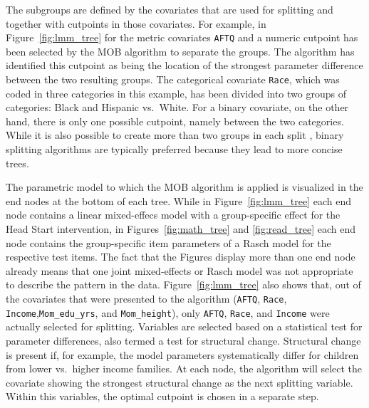 \documentclass[doc,floatsintext,natbib]{apa7}
\begin{document}
The subgroups are defined by the covariates that are used for splitting and together with cutpoints in those covariates. For example, in Figure~\ref{fig:lmm_tree} for the metric covariates \texttt{AFTQ} and  a numeric cutpoint has been selected by the MOB algorithm to separate the groups. The algorithm has identified this cutpoint as being the location of the strongest parameter difference between the two resulting groups. The categorical covariate \texttt{Race}, which was coded in three categories in this example, has been divided into two groups of categories: Black and Hispanic vs.~White. For a binary covariate,  
on the other hand, there is only one possible cutpoint, namely between the two categories. While it is also possible to create more than two groups in each split \citep{KimLoh:2001,Qui:1993}, binary splitting algorithms are typically preferred because they lead to more concise trees. 

The parametric model to which the MOB algorithm is applied is visualized in the end nodes at the bottom of each tree. While in Figure~\ref{fig:lmm_tree} each end node contains a linear mixed-effecs model with a group-specific effect for the Head Start intervention, in Figures~\ref{fig:math_tree} and \ref{fig:read_tree} each end node contains the group-specific item parameters of a Rasch model for the respective test items. 
The fact that the Figures display more than one end node already means that one joint mixed-effects or Rasch model was not appropriate to describe the pattern in the data. Figure~\ref{fig:lmm_tree} also shows that, out of the  covariates that were presented to the algorithm (\texttt{AFTQ}, \texttt{Race}, \texttt{Income},\texttt{Mom\_edu\_yrs}, and \texttt{Mom\_height}), only \texttt{AFTQ}, \texttt{Race}, and \texttt{Income} were actually selected for splitting. Variables are selected based on a statistical test for parameter differences, also termed a test for structural change. Structural change is present if, for example, the model parameters systematically differ for children from lower vs.~higher income families. At each node, the algorithm will select the covariate showing the strongest structural change as the next splitting variable. Within this variables, the optimal cutpoint is chosen in a separate step.
\end{document}

